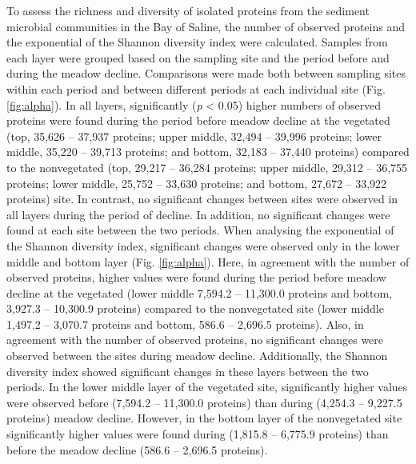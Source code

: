 \documentclass[
  12 pt,
]{article}
\begin{document}
To assess the richness and diversity of isolated proteins from the sediment microbial communities in the Bay of Saline, the number of observed proteins and the exponential of the Shannon diversity index were calculated. Samples from each layer were grouped based on the sampling site and the period before and during the meadow decline. Comparisons were made both between sampling sites within each period and between different periods at each individual site (Fig. \ref{fig:alpha}). In all layers, significantly (\emph{p} \textless{} 0.05) higher numbers of observed proteins were found during the period before meadow decline at the vegetated (top, 35,626 -- 37,937 proteins; upper middle, 32,494 -- 39,996 proteins; lower middle, 35,220 -- 39,713 proteins; and bottom, 32,183 -- 37,440 proteins) compared to the nonvegetated (top, 29,217 -- 36,284 proteins; upper middle, 29,312 -- 36,755 proteins; lower middle, 25,752 -- 33,630 proteins; and bottom, 27,672 -- 33,922 proteins) site. In contrast, no significant changes between sites were observed in all layers during the period of decline. In addition, no significant changes were found at each site between the two periods. When analysing the exponential of the Shannon diversity index, significant changes were observed only in the lower middle and bottom layer (Fig. \ref{fig:alpha}). Here, in agreement with the number of observed proteins, higher values were found during the period before meadow decline at the vegetated (lower middle 7,594.2 -- 11,300.0 proteins and bottom, 3,927.3 -- 10,300.9 proteins) compared to the nonvegetated site (lower middle 1,497.2 -- 3,070.7 proteins and bottom, 586.6 -- 2,696.5 proteins). Also, in agreement with the number of observed proteins, no significant changes were observed between the sites during meadow decline. Additionally, the Shannon diversity index showed significant changes in these layers between the two periods. In the lower middle layer of the vegetated site, significantly higher values were observed before (7,594.2 -- 11,300.0 proteins) than during (4,254.3 -- 9,227.5 proteins) meadow decline. However, in the bottom layer of the nonvegetated site significantly higher values were found during (1,815.8 -- 6,775.9 proteins) than before the meadow decline (586.6 -- 2,696.5 proteins).
\end{document}

